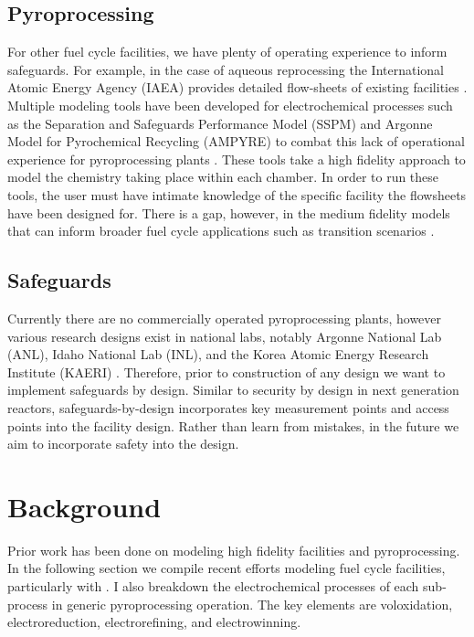 \subsection{Pyroprocessing}
For other fuel cycle facilities, we have plenty of operating experience to inform safeguards. For example, in the case of aqueous reprocessing
the International Atomic Energy Agency (IAEA) provides detailed flow-sheets of existing facilities \cite{international_atomic_energy_agency_implications_2004}. Multiple modeling
tools have been developed for electrochemical processes such as the Separation and Safeguards Performance Model (SSPM) and Argonne Model for Pyrochemical Recycling (AMPYRE) to combat this lack of operational experience for pyroprocessing plants \cite{maggos_update_2015}. 
These tools take a high fidelity approach to model the
chemistry taking place within each chamber. In order to run these tools, the user must have intimate knowledge of the specific facility the flowsheets have
been designed for. There is a gap, however, in the medium fidelity models that can inform broader fuel cycle applications such as transition scenarios \cite{borrelli_approaches_2017}. 

\subsection{Safeguards}
Currently there are no commercially operated pyroprocessing plants, however various research designs exist in national labs,
notably Argonne National Lab (ANL), Idaho National Lab (INL), and the Korea Atomic Energy Research Institute (KAERI) \cite{michael_f._simpson_developments_2012, lee_advanced, frigo_conceptual_2003}. 
Therefore, prior to construction of any design we 
want to implement safeguards by design. Similar to security by design in next generation reactors, safeguards-by-design incorporates key measurement 
points and access points into the facility design. Rather than learn from mistakes, in the future we aim to incorporate safety 
into the design.

\section{Background}
Prior work has been done on modeling high fidelity facilities and pyroprocessing. In the following section we compile recent efforts modeling fuel cycle facilities, particularly with
\Cyclus. I also breakdown the electrochemical processes of each sub-process in generic pyroprocessing operation. The key elements are voloxidation, electroreduction, electrorefining, and electrowinning. 

